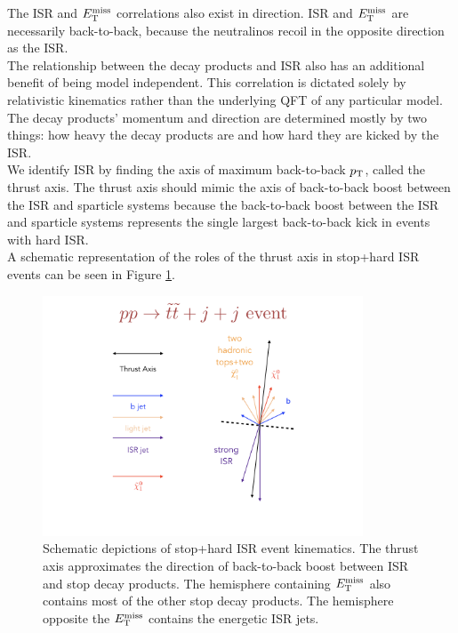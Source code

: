 \indent The ISR and $E_{\mathrm{T}}^{\mathrm{miss}}$ correlations also exist in direction.  ISR and $E_{\mathrm{T}}^{\mathrm{miss}}$ are necessarily back-to-back, because the neutralinos recoil in the opposite direction as the ISR.  \\%

\indent The relationship between the decay products and ISR also has an additional benefit of being model independent.  This correlation is dictated solely by relativistic kinematics rather than the underlying QFT of any particular model.  The decay products' momentum and direction are determined mostly by two things: how heavy the decay products are and how hard they are kicked by the ISR.  \\

\indent We identify ISR by finding the axis of maximum back-to-back $p_{\mathrm{T}}$, called the thrust axis.  The thrust axis should mimic the axis of back-to-back boost between the ISR and sparticle systems because the back-to-back boost between the ISR and sparticle systems represents the single largest back-to-back kick in events with hard ISR. \\

\indent A schematic representation of the roles of the thrust axis in stop+hard ISR events can be seen in Figure \ref{fig:ISR:ttbar_sig_example}. \\

\begin{figure}[h!]
  \centering
	\includegraphics[width=0.85\textwidth]{./figures/strategy/ISR_signal.png}
	\caption[Schematic depictions of stop+hard ISR event kinematics]{Schematic depictions of stop+hard ISR event kinematics.  The thrust axis approximates the direction of back-to-back boost between ISR and stop decay products.  The hemisphere containing $E_{\mathrm{T}}^{\mathrm{miss}}$ also contains most of the other stop decay products.  The hemisphere opposite the $E_{\mathrm{T}}^{\mathrm{miss}}$ contains the energetic ISR jets. }
	\label{fig:ISR:ttbar_sig_example}
\end{figure}

